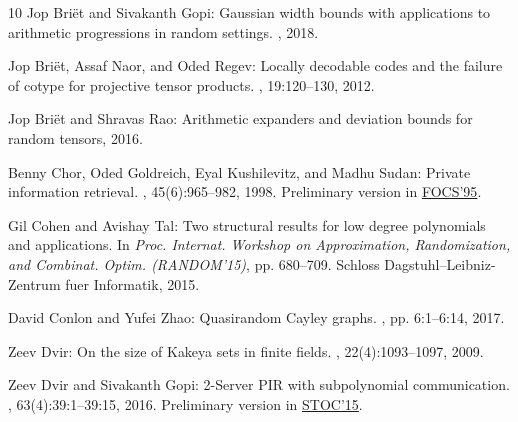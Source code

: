 \documentclass[11pt]{article}
\numberwithin{equation}{section}
\theoremstyle{definition}
\theoremstyle{plain}
\begin{document}
\begin{thebibliography}{10}
{\sc Jop Bri{\"e}t and Sivakanth Gopi}: Gaussian width bounds with applications
  to arithmetic progressions in random settings.
, 2018.

{\sc Jop Bri\"{e}t, Assaf Naor, and Oded Regev}: Locally decodable codes and
  the failure of cotype for projective tensor products.
, 19:120--130, 2012.

{\sc Jop Bri{\"e}t and Shravas Rao}: Arithmetic expanders and deviation bounds
  for random tensors, 2016.

{\sc Benny Chor, Oded Goldreich, Eyal Kushilevitz, and Madhu Sudan}: Private
  information retrieval.
, 45(6):965--982, 1998.
\newblock Preliminary version in
  \href{https://doi.org/10.1109/SFCS.1995.492461}{FOCS'95}.
\newblock [\epfmtdoi{10.1145/293347.293350}]

{\sc Gil Cohen and Avishay Tal}: Two structural results for low degree
  polynomials and applications.
\newblock In {\em Proc. Internat. Workshop on Approximation, Randomization, and
  Combinat. Optim. (RANDOM'15)}, pp. 680--709. Schloss
  Dagstuhl--Leibniz-Zentrum fuer Informatik, 2015.

{\sc David Conlon and Yufei Zhao}: Quasirandom {C}ayley graphs.
, pp. 6:1--6:14, 2017.

{\sc Zeev Dvir}: On the size of {K}akeya sets in finite fields.
, 22(4):1093--1097, 2009.

{\sc Zeev Dvir and Sivakanth Gopi}: 2-{S}erver {PIR} with subpolynomial
  communication.
, 63(4):39:1--39:15, 2016.
\newblock Preliminary version in
  \href{https://dl.acm.org/citation.cfm?id=2746546}{STOC'15}.


\end{thebibliography}
\end{document}
